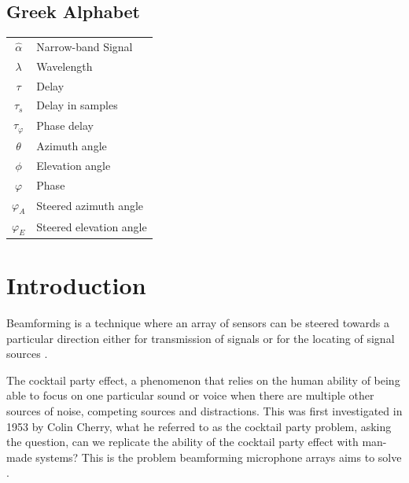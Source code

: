 \documentclass{UoNMCHA}
\numberwithin{equation}{section}
\begin{document}
    \subsection*{Greek Alphabet}
    \begin{table}[H]
        \begin{tabular}{cl}
            $\hat{\alpha}$&Narrow-band Signal\\
            $\lambda$&Wavelength\\
            $\tau$&Delay\\
            $\tau_s$&Delay in samples\\
            $\tau_\varphi$&Phase delay\\
            $\theta$&Azimuth angle\\
            $\phi$&Elevation angle\\
            $\varphi$&Phase\\
            $\varphi_A$&Steered azimuth angle\\
            $\varphi_E$&Steered elevation angle
        \end{tabular}
    \end{table}
\newpage
\onehalfspacing
\section{Introduction} \label{sec:Introduction}
    
    Beamforming is a technique where an array of sensors can be steered towards a particular direction either for transmission of signals or for the locating of signal sources \citep{Sha18}.
    
    The cocktail party effect, a phenomenon that relies on the human ability of being able to focus on one particular sound or voice when there are multiple other sources of noise, competing sources and distractions. This was first investigated in 1953 by Colin Cherry, what he referred to as the cocktail party problem, asking the question, can we replicate the ability of the cocktail party effect with man-made systems? This is the problem beamforming microphone arrays aims to solve \citep{Ben08}.
    
\end{document}

